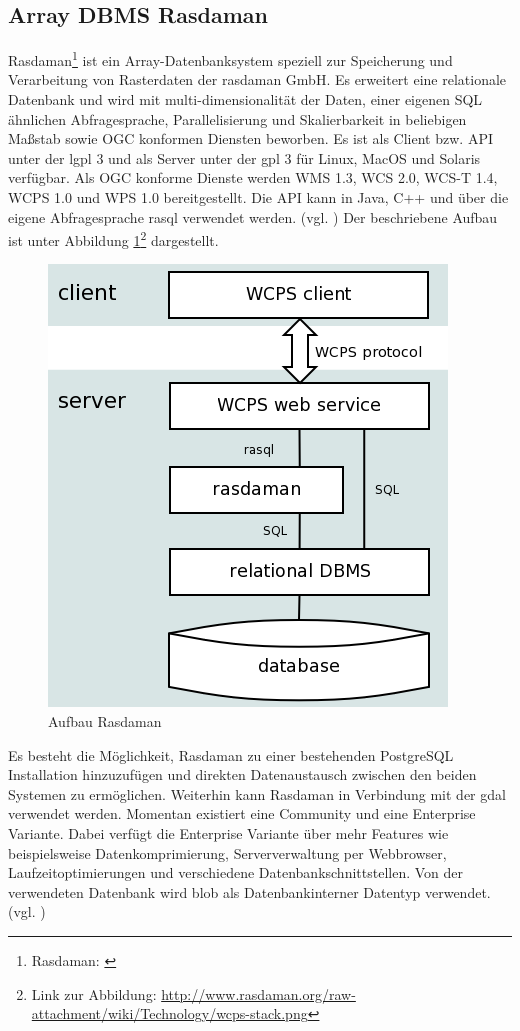 \subsection{Array DBMS Rasdaman}
Rasdaman\footnote{Rasdaman: \cite{website:rasdaman.org}} ist ein Array-Datenbanksystem speziell zur Speicherung und Verarbeitung von Rasterdaten der rasdaman GmbH.
Es erweitert eine relationale Datenbank und wird mit  multi-dimensionalität der Daten, einer eigenen SQL ähnlichen Abfragesprache, Parallelisierung und Skalierbarkeit in beliebigen Maßstab sowie OGC konformen Diensten beworben.
Es ist als Client bzw. API unter der \Gls{lgpl} 3 und als Server unter der \Gls{gpl} 3 für Linux, MacOS und Solaris verfügbar.
Als OGC konforme Dienste werden WMS 1.3, WCS 2.0, WCS-T 1.4, WCPS 1.0 und WPS 1.0 bereitgestellt.
Die API kann in Java, C++ und über die eigene Abfragesprache rasql verwendet werden. (vgl. \cite{website:rasdamanogeo})
Der beschriebene Aufbau ist unter Abbildung \ref{fig:rasdaman}\footnote{Link zur Abbildung: \url{http://www.rasdaman.org/raw-attachment/wiki/Technology/wcps-stack.png}} dargestellt.
\begin{figure}[hp]
\centering
\includegraphics[width=.4\textwidth]{Abbildungen/rasdaman-aufbau.png}
\caption[Aufbau Rasdaman]{Aufbau Rasdaman}
\label{fig:rasdaman}
\end{figure}

Es besteht die Möglichkeit, Rasdaman zu einer bestehenden PostgreSQL Installation hinzuzufügen und direkten Datenaustausch zwischen den beiden Systemen zu ermöglichen.
Weiterhin kann Rasdaman in Verbindung mit der \Gls{gdal} verwendet werden.
Momentan existiert eine Community und eine Enterprise Variante. Dabei verfügt die Enterprise Variante über mehr Features wie beispielsweise Datenkomprimierung, Serververwaltung per Webbrowser, Laufzeitoptimierungen und verschiedene Datenbankschnittstellen.
Von der verwendeten Datenbank wird \Gls{blob} als Datenbankinterner Datentyp verwendet. (vgl. \cite{website:rasdamanowiki})